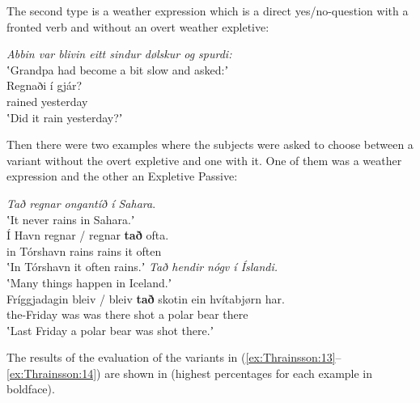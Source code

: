 \documentclass[output=paper]{LSP/langsci}
\begin{document}
\newpage 
The second type is a weather expression which is a direct yes\slash no-question with a fronted verb and without an overt weather expletive: 

\ea%
    \label{ex:Thrainsson:14}
	\textit{Abbin var blivin eitt sindur dølskur og spurdi:}\\
	\glt ʽGrandpa had become a bit slow and asked:ʼ\\
    \gll    Regnaði   {í gjár?}  \\
		    rained    yesterday\\
    \glt ʽDid it rain yesterday?ʼ
 \z

Then there were two examples where the subjects were asked to choose between a variant without the overt expletive and one with it. One of them was a weather expression and the other an Expletive Passive:

\ea%
    \label{ex:Thrainsson:15}
	\ea
	\textit{Tað regnar ongantíð í Sahara}.\\
	\glt ʽIt never rains in Sahara.ʼ\\
    \gll Í Havn       regnar  /   regnar \textbf{tað} ofta.\\
		 in Tórshavn    rains  {}   rains   it    often\\
	\glt ʽIn Tórshavn it often rains.ʼ
	\ex
	\textit{Tað hendir nógv í Íslandi.}\\
	\glt	ʽMany things happen in Iceland.ʼ\\
	\gll	Fríggjadagin   bleiv   /   bleiv   \textbf{tað}  skotin ein hvítabjørn   har. \\
			the-Friday    was      {}  was  there  shot  a   {polar bear}  there\\
	\glt	ʽLast Friday a polar bear was shot there.ʼ
\z
\z

The results of the evaluation of the variants in (\ref{ex:Thrainsson:13}--\ref{ex:Thrainsson:14}) are shown in  (highest percentages for each example in boldface).
\end{document}
